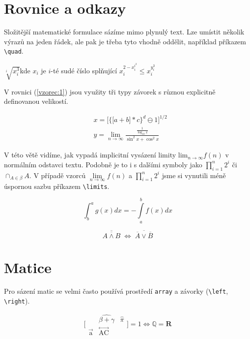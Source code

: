 \documentclass[a4paper,11pt]{article}
\theoremstyle{definition}
\theoremstyle{plain}
\begin{document}
{  \section{Rovnice a odkazy}

    Složitější matematické formulace sázíme mimo plynulý
    text. Lze umístit několik výrazů na jeden řádek, ale pak je
    třeba tyto vhodně oddělit, například příkazem \verb"\quad".\bigskip

  $\sqrt[i]{x^3_i}$\quad kde $x_{i}$ je $i$-té sudé číslo splňující \quad $x_{i}^{2-x_{i}^{i^{2}}}\leq x_{i}^{y_{i}^{3}}$\medskip

  V rovnici (\ref{vzorec:1}) jsou využity tři typy závorek s různou explicitně definovanou velikostí.

  \begin{align}\label{vzorec:1}
    &x=\bigg[\Big\{ \big[ a+b\big] *c\Big\}^{d}\ominus 1\bigg]^{1/2}\\
    &y=\lim_{n \rightarrow \infty}\frac{\frac{1}{\log_{10}x}}{\sin^{2}x+\cos^{2}x}\nonumber
  \end{align}

  V této větě vidíme, jak vypadá implicitní vysázení limity lim$_{n \rightarrow \infty} f(n)$ v normálním odstavci textu. Podobně je to i s dalšími symboly jako $\prod_{i=1}^{n}2^{i}$ či $\cap_{A\in\beta}A$. V případě vzorců $\lim\limits_{n \rightarrow \infty}f(n)$ a $\prod\limits_{i=1}^{n}2^i$ jsme si vynutili méně úspornou sazbu příkazem \verb"\limits".

  \begin{equation}
    \int_{b}^{a}g(x)dx=-\int\limits_{a}^{b}f(x)dx
  \end{equation}
  
  \begin{equation}
    \overline{\overline{A\wedge B}}\;\Leftrightarrow\;\overline{\overline{A}\vee\overline{B}}
  \end{equation}
  
  \section{Matice}
  
    Pro sázení matic se velmi často používá prostředí \verb"array" a závorky (\verb"\left", \verb"\right").
    
  \begin{equation}
    \Bigg[\begin{array}{lcr}&\widehat{\beta+\gamma}&\hat{\pi}\\\mathop{a}\limits^{\rightarrow}&\mathop{AC}\limits^{\longleftrightarrow}&\end{array}\Bigg]=1\Longleftrightarrow \mathbb{Q}=\textbf{R}\nonumber
  \end{equation}
  
}
\end{document}

